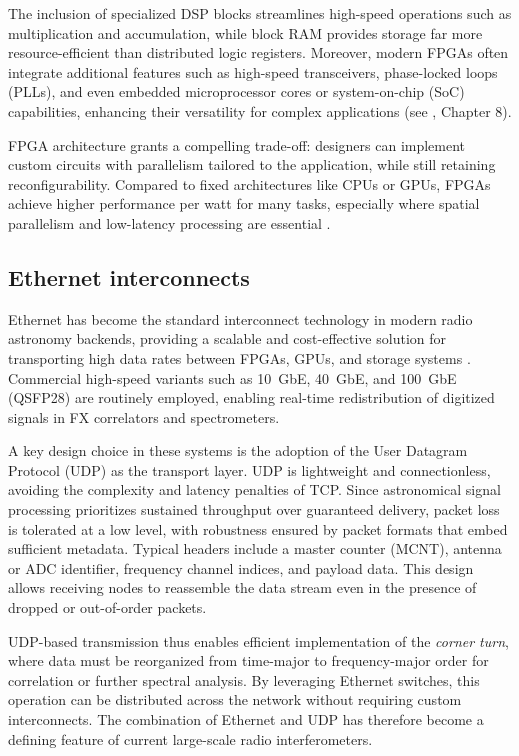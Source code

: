 The inclusion of specialized DSP blocks streamlines high-speed operations such as multiplication and accumulation, while block RAM provides storage far more resource-efficient than distributed logic registers. Moreover, modern FPGAs often integrate additional features such as high-speed transceivers, phase-locked loops (PLLs), and even embedded microprocessor cores or system-on-chip (SoC) capabilities, enhancing their versatility for complex applications (see \citealt{zhang2018fpga}, Chapter 8).

FPGA architecture grants a compelling trade-off: designers can implement custom circuits with parallelism tailored to the application, while still retaining reconfigurability. Compared to fixed architectures like CPUs or GPUs, FPGAs achieve higher performance per watt for many tasks, especially where spatial parallelism and low-latency processing are essential \citep{kuon2008fpga,zhang2018fpga}.

\subsection{Ethernet interconnects}

Ethernet has become the standard interconnect technology in modern radio astronomy backends, providing a scalable and cost-effective solution for transporting high data rates between FPGAs, GPUs, and storage systems \citep{Price_2020}. Commercial high-speed variants such as 10~GbE, 40~GbE, and 100~GbE (QSFP28) are routinely employed, enabling real-time redistribution of digitized signals in FX correlators and spectrometers.  

A key design choice in these systems is the adoption of the User Datagram Protocol (UDP) as the transport layer. UDP is lightweight and connectionless, avoiding the complexity and latency penalties of TCP. Since astronomical signal processing prioritizes sustained throughput over guaranteed delivery, packet loss is tolerated at a low level, with robustness ensured by packet formats that embed sufficient metadata. Typical headers include a master counter (MCNT), antenna or ADC identifier, frequency channel indices, and payload data. This design allows receiving nodes to reassemble the data stream even in the presence of dropped or out-of-order packets.  

UDP-based transmission thus enables efficient implementation of the \emph{corner turn}, where data must be reorganized from time-major to frequency-major order for correlation or further spectral analysis. By leveraging Ethernet switches, this operation can be distributed across the network without requiring custom interconnects. The combination of Ethernet and UDP has therefore become a defining feature of current large-scale radio interferometers.  


